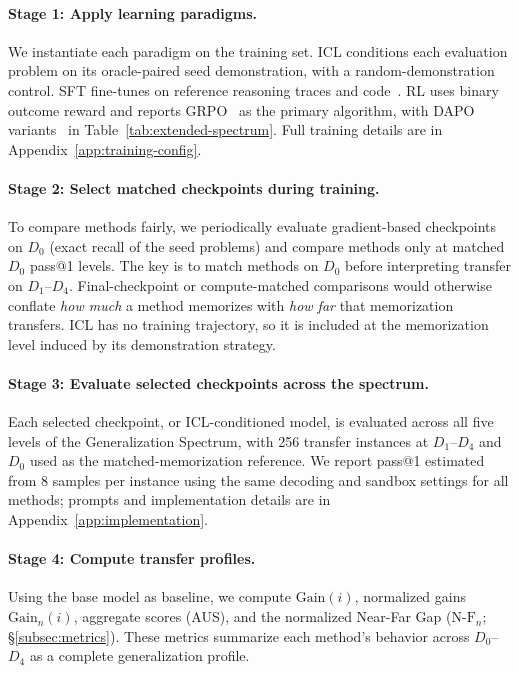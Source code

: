 \documentclass[]{bytedance_seed}
\theoremstyle{plain}
\theoremstyle{definition}
\theoremstyle{remark}
\begin{document}
\paragraph{Stage 1: Apply learning paradigms.}
We instantiate each paradigm on the training set. ICL conditions each evaluation problem on its oracle-paired seed demonstration, with a random-demonstration control. SFT fine-tunes on reference reasoning traces and code~\citep{ouyang2022training}. RL uses binary outcome reward and reports GRPO~\citep{shao2024grpo} as the primary algorithm, with DAPO variants~\citep{yu2025dapo,schulman2017ppo} in Table~\ref{tab:extended-spectrum}. Full training details are in Appendix~\ref{app:training-config}.

\paragraph{Stage 2: Select matched checkpoints during training.}
To compare methods fairly, we periodically evaluate gradient-based checkpoints on $D_0$ (exact recall of the seed problems) and compare methods only at matched $D_0$ pass@1 levels. The key is to match methods on $D_0$ before interpreting transfer on $D_1$--$D_4$. Final-checkpoint or compute-matched comparisons would otherwise conflate \emph{how much} a method memorizes with \emph{how far} that memorization transfers. ICL has no training trajectory, so it is included at the memorization level induced by its demonstration strategy.

\paragraph{Stage 3: Evaluate selected checkpoints across the spectrum.}
Each selected checkpoint, or ICL-conditioned model, is evaluated across all five levels of the Generalization Spectrum, with 256 transfer instances at $D_1$--$D_4$ and $D_0$ used as the matched-memorization reference. We report pass@1 estimated from 8 samples per instance using the same decoding and sandbox settings for all methods; prompts and implementation details are in Appendix~\ref{app:implementation}.

\paragraph{Stage 4: Compute transfer profiles.}
Using the base model as baseline, we compute $\text{Gain}(i)$, normalized gains $\text{Gain}_n(i)$, aggregate scores (AUS), and the normalized Near-Far Gap ($\text{N-F}_n$; \S\ref{subsec:metrics}). These metrics summarize each method's behavior across $D_0$--$D_4$ as a complete generalization profile.
\end{document}
